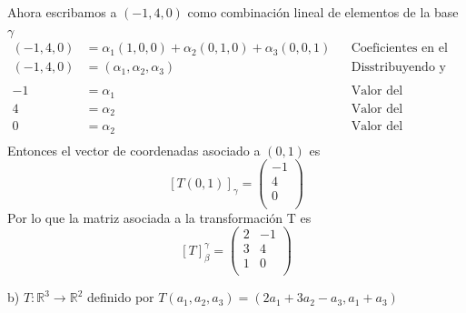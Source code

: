 \documentclass[letterpaper]{article}
\renewcommand{\*}{\cdot}
\theoremstyle{definition}
\begin{document}
		Ahora escribamos a $ (- 1, 4, 0) $ como combinación lineal de elementos de la base $ \gamma $
		\begin{align*}
			(- 1, 4, 0) &= \alpha_1(1,0,0)+ \alpha_2(0,1,0)+ \alpha_3(0,0,1) && \text{Coeficientes en el campo}\\
			(- 1, 4, 0) &= (\alpha_1,\alpha_2,\alpha_3) && \text{Disstribuyendo y sumando entrada a entrada}\\
			\\
			- 1 &= \alpha_1 && \text{Valor del coeficiente}\\
			4 &= \alpha_2 && \text{Valor del coeficiente}\\
			0 &= \alpha_2 && \text{Valor del coeficiente}\\
		\end{align*}
		Entonces el vector de coordenadas asociado a $ (0,1) $ es
				$$ [T(0,1)]_{\gamma} = \begin{pmatrix}
				-1\\
				4\\
				0\\
				\end{pmatrix} $$
		Por lo que la matriz asociada a la transformación T es 
		\[ [T]_{\beta}^{\gamma} = \begin{pmatrix}
					2 & -1 \\
					3 & 4 \\
					1 & 0 \\
		\end{pmatrix} \]
		
		
		b) $T: \mathbb{R}^{3} \longrightarrow \mathbb{R}^{2}$ definido por 
		$T(a_{1},a_{2},a_{3}) = (2a_{1} + 3a_{2} - a_{3}, a_{1} + a_{3})$
		
\end{document}
